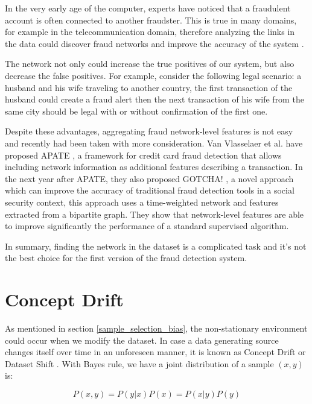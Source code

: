 In the very early age of the computer, experts have noticed that a fraudulent account is often connected to another fraudster. This is true in many domains, for example in the telecommunication domain, therefore analyzing the links in the data could discover fraud networks and improve the accuracy of the system \citep{fast2007relational}.

The network not only could increase the true positives of our system, but also decrease the false positives. For example, consider the following legal scenario: a husband and his wife traveling to another country, the first transaction of the husband could create a fraud alert then the next transaction of his wife from the same city should be legal with or without confirmation of the first one.

Despite these advantages, aggregating fraud network-level features is not easy and recently had been taken with more consideration. Van Vlasselaer et al. have proposed APATE \citep{van2015apate}, a framework for credit card fraud detection that allows including network information as additional features describing a transaction. In the next year after APATE, they also proposed GOTCHA! \citep{van2016gotcha}, a novel approach which can improve the accuracy of traditional fraud detection tools in a social security context, this approach uses a time-weighted network and features extracted from a bipartite graph. They show that network-level features are able to improve significantly the performance of a standard supervised algorithm.

In summary, finding the network in the dataset is a complicated task and it's not the best choice for the first version of the fraud detection system.


\section{Concept Drift}
\label{concept_drift}

As mentioned in section \ref{sample_selection_bias}, the non-stationary environment could occur when we modify the dataset. In case a data generating source changes itself over time in an unforeseen manner, it is known as Concept Drift \citep{gama2014survey} or Dataset Shift \citep{quionero2009dataset}. With Bayes rule, we have a joint distribution of a sample $(x, y)$ is:


\begin{equation}
P(x, y) = P(y|x)P(x) = P(x|y)P(y)
\end{equation}


